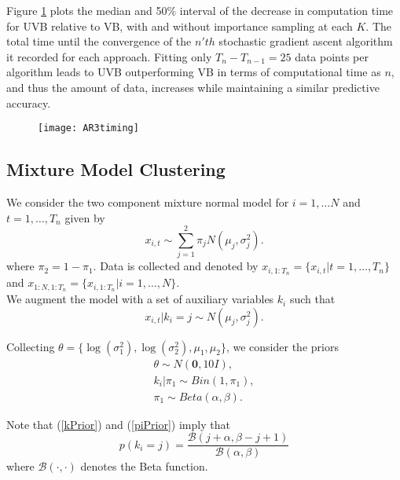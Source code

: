\documentclass[12pt,a4paper]{article}\usepackage[]{graphicx}\usepackage[]{color}
\begin{document}
Figure \ref{fig:timing} plots the median and 50\% interval of the decrease in computation time for UVB relative to VB, with and without importance sampling at each $K$. The total time until the convergence of the $n'th$ stochastic gradient ascent algorithm it recorded for each approach. Fitting only $T_n - T_{n-1} = 25$ data points per algorithm leads to UVB outperforming VB in terms of computational time as $n$, and thus the amount of data, increases while maintaining a similar predictive accuracy.

\begin{figure}
\centering
\texttt{[image: AR3timing]}
\caption{}
\label{fig:timing}
\end{figure}

\subsection{Mixture Model Clustering}

We consider the two component mixture normal model for $i = 1, \dots N$ and $t = 1, \dots, T_n$ given by
\begin{equation}
\label{mixNormalDGP1}
x_{i, t} \sim \sum_{j=1}^2 \pi_{j} N(\mu_j, \sigma^2_{j}).
\end{equation}
where $\pi_2 = 1 - \pi_1$. Data is collected and denoted by $x_{i, 1:T_n} = \{x_{i, t} | t = 1, \dots, T_n\}$ and $x_{1:N, 1:T_n} = \{x_{i, 1:T_n} | i = 1, \dots, N \}$.
\\

We augment the model with a set of auxiliary variables $k_i$ such that
\begin{equation}
\label{mixNormalDGP2}
x_{i, t} | k_i = j \sim  N(\mu_j, \sigma^2_{j}).
\end{equation}

Collecting $\theta = \{\log(\sigma^2_1), \log(\sigma^2_2), \mu_1, \mu_2 \}$, we consider the priors
\begin{align}
\theta \sim N(\boldsymbol{0}, 10 I), \\
k_i | \pi_1 \sim Bin(1, \pi_1), \label{kPrior} \\
\pi_1 \sim Beta(\alpha, \beta). \label{piPrior}
\end{align}

Note that (\ref{kPrior}) and (\ref{piPrior}) imply that 
\begin{equation}
\label{kMarginal}
p(k_i = j) = \frac{\mathcal{B}(j + \alpha, \beta - j + 1)}{\mathcal{B}(\alpha, \beta)}
\end{equation}
where $\mathcal{B}(\cdot, \cdot)$ denotes the Beta function.
\end{document}
